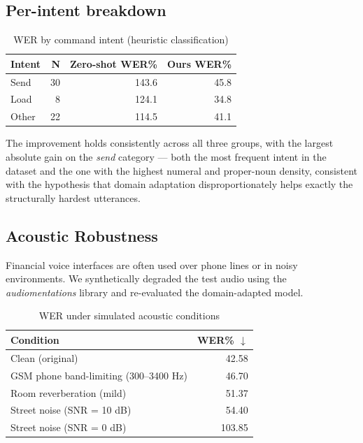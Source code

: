 \documentclass[11pt,a4paper]{article}
\begin{document}
\subsection{Per-intent breakdown}

\begin{table}[H]
\centering
\caption{WER by command intent (heuristic classification)}
\label{tab:intent}
\begin{tabular}{lrrr}
\toprule
\textbf{Intent} & \textbf{N} & \textbf{Zero-shot WER\%} & \textbf{Ours WER\%} \\
\midrule
Send     & 30 & 143.6 & 45.8 \\
Load     &  8 & 124.1 & 34.8 \\
Other    & 22 & 114.5 & 41.1 \\
\bottomrule
\end{tabular}
\end{table}

The improvement holds consistently across all three groups, with the
largest absolute gain on the \textit{send} category --- both the most
frequent intent in the dataset and the one with the highest numeral and
proper-noun density, consistent with the hypothesis that domain adaptation
disproportionately helps exactly the structurally hardest utterances.

\subsection{Acoustic Robustness}

Financial voice interfaces are often used over phone lines or in noisy
environments. We synthetically degraded the test audio using the
\textit{audiomentations} library and re-evaluated the domain-adapted model.

\begin{table}[H]
\centering
\caption{WER under simulated acoustic conditions}
\label{tab:robustness}
\begin{tabular}{lr}
\toprule
\textbf{Condition} & \textbf{WER\% $\downarrow$} \\
\midrule
Clean (original) & 42.58 \\
GSM phone band-limiting (300--3400 Hz) & 46.70 \\
Room reverberation (mild) & 51.37 \\
Street noise (SNR = 10 dB) & 54.40 \\
Street noise (SNR = 0 dB) & 103.85 \\
\bottomrule
\end{tabular}
\end{table}
\end{document}
